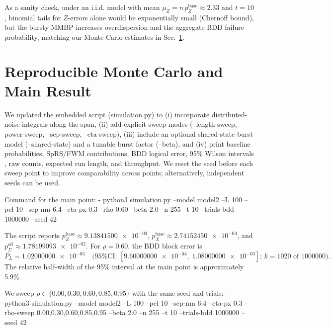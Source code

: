 \documentclass[conference]{IEEEtran}
\newcommand{\nexact}[1]{\num[round-mode=off]{#1}}
\newcommand{\simL}{100}
\newcommand{\simpcl}{10}
\newcommand{\simsep}{6.4}
\newcommand{\simeta}{0.3}
\newcommand{\simn}{255}
\newcommand{\simt}{10}
\newcommand{\simtrials}{1000000}
\newcommand{\simseed}{42}
\newcommand{\simpz}{9.13841500e-03}
\newcommand{\simpx}{2.74152450e-03}
\newcommand{\simpesum}{1.78199093e-02}
\newcommand{\simrhoB}{0.60}
\newcommand{\simpLB}{1.02000000e-03}
\newcommand{\simpLBlo}{9.60000000e-04}
\newcommand{\simpLBhi}{1.08000000e-03}
\newcommand{\simkB}{1020}
\newcommand{\simrhoD}{0.00}
\newcommand{\simrhoA}{0.30}
\newcommand{\simrhoC}{0.85}
\newcommand{\simrhoE}{0.95}
\newcommand{\simRelHalfWidthMain}{5.9\%}
\begin{document}
As a sanity check, under an i.i.d. model with mean \( \mu_Z = n\,p_Z^{\text{base}} \approx 2.33\) and \(t=10\), binomial tails for \(Z\)-errors alone would be exponentially small (Chernoff bound), but the bursty MMBP increases overdispersion and the aggregate BDD failure probability, matching our Monte Carlo estimates in Sec.~\ref{sec:results}.

\section{Reproducible Monte Carlo and Main Result}\label{sec:results}
We updated the embedded script (simulation.py) to (i) incorporate distributed-noise integrals along the span, (ii) add explicit sweep modes (--length-sweep, --power-sweep, --sep-sweep, --eta-sweep), (iii) include an optional shared-state burst model (--shared-state) and a tunable burst factor (--beta), and (iv) print baseline probabilities, SpRS/FWM contributions, BDD logical error, 95\% Wilson intervals \cite{Wilson1927JASA}, raw counts, expected run length, and throughput. We reset the seed before each sweep point to improve comparability across points; alternatively, independent seeds can be used.

Command for the main point:
- python3 simulation.py --model model2 --L \simL{} --pcl \simpcl{} --sep-nm \simsep{} --eta-px \simeta{} --rho \simrhoB{} --beta 2.0 --n \simn{} --t \simt{} --trials-bdd \simtrials{} --seed \simseed

The script reports \(p_Z^{\text{base}}\approx \nexact{\simpz}\), \(p_X^{\text{base}}\approx \nexact{\simpx}\), and \(p_{\Sigma}^{\mathrm{eff}}\approx \nexact{\simpesum}\). For \(\rho=\simrhoB\), the BDD block error is
\[
P_L=\nexact{\simpLB}\quad\text{(95\% CI: }[\nexact{\simpLBlo},\;\nexact{\simpLBhi}]\text{; }k=\simkB\text{ of } \simtrials\text{)}.
\]
The relative half-width of the 95\% interval at the main point is approximately \simRelHalfWidthMain{}.

We sweep \(\rho\in\{\simrhoD,\simrhoA,\simrhoB,\simrhoC,\simrhoE\}\) with the same seed and trials:
- python3 simulation.py --model model2 --L \simL{} --pcl \simpcl{} --sep-nm \simsep{} --eta-px \simeta{} --rho-sweep \simrhoD{},\simrhoA{},\simrhoB{},\simrhoC{},\simrhoE{} --beta 2.0 --n \simn{} --t \simt{} --trials-bdd \simtrials{} --seed \simseed
\end{document}
